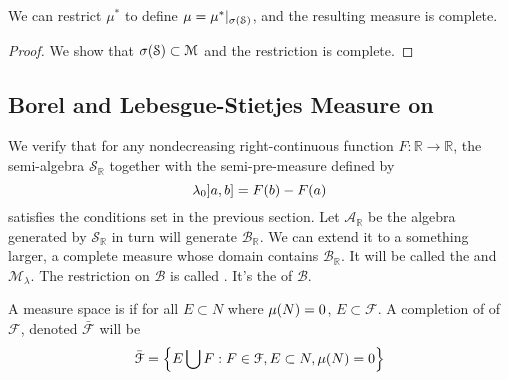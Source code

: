 \begin{thm}
    We can restrict \(\mu^{*}\) to define \(\mu= \mu^{*}|_{\sigma\pqty{\mathcal{S}}}\), and the resulting measure is complete. 
\end{thm}

\begin{proof}
    We show that \(\sigma\pqty{\mathcal{S}}\subset \mathcal{M}\) and the restriction is complete. 
\end{proof}

\subsection{Borel and Lebesgue-Stietjes Measure on }

We verify that for any nondecreasing right-continuous function \(F: \mathbb{R}\to \mathbb{R}\), the semi-algebra \(\mathcal{S}_{\mathbb{R}}\) together with the semi-pre-measure defined by 
\begin{equation*}
    \lambda_{0} \linterval{a}{b} = F(b) - F(a)
\end{equation*}
satisfies the conditions set in the previous section. Let \(\mathcal{A}_{\mathbb{R}}\) be the algebra generated by \(\mathcal{S}_{\mathbb{R}}\) in turn will generate \(\mathcal{B}_{\mathbb{R}}\). We can extend it to a something larger, a complete measure whose domain contains \(\mathcal{B}_{\mathbb{R}}\). It will be called the  and  \(\mathcal{M}_{\lambda}\). The restriction on \(\mathcal{B}\) is called . It's the  of \(\mathcal{B}\).

A measure space is  if for all \(E\subset N\) where \(\mu\pqty{N}=0\), \(E\subset \mathcal{F}\). A completion of of \(\mathcal{F}\), denoted \(\bar{\mathcal{F}}\) will be 
\begin{equation*}
    \bar{\mathcal{F}} = \Bqty{E \cup F: F\in \mathcal{F}, E\subset N, \mu(N) = 0}
\end{equation*}


